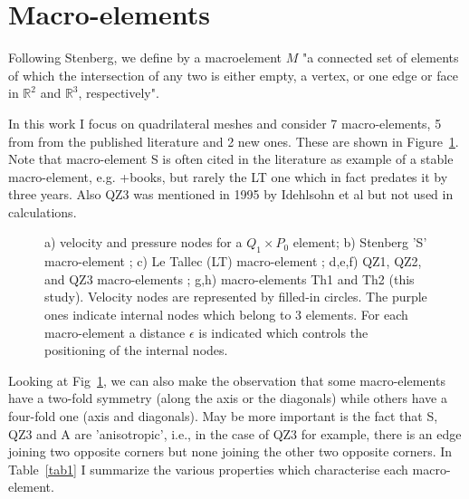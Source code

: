\documentclass[a4paper]{article}
\begin{document}





\section{Macro-elements}\label{sec3}

Following Stenberg\cite{sten90}, we define by a macroelement $M$ "a connected set of elements of which the 
intersection of any two is either empty, a vertex, or one edge or face in $\mathbb{R}^2$ 
and $\mathbb{R}^3$, respectively".

In this work I focus on quadrilateral meshes and consider 7 
macro-elements, 5 from from the published literature and 2 new ones. These are shown in Figure~\ref{fig:mes}.
Note that macro-element S is often cited in the literature as example of a stable macro-element, 
e.g. \cite{chba93}+books, but rarely the LT one which in fact predates it by three years. 
Also QZ3 was mentioned in 1995 by Idehlsohn et al \cite{idsn95} but not used in calculations. 

\begin{figure}[t]

\caption{
a) velocity and pressure nodes for a $Q_1\times P_0$ element;
b) Stenberg 'S' macro-element \cite{sten84}; 
c) Le Tallec (LT) macro-element \cite{leta81,leru86}; 
d,e,f) QZ1, QZ2, and QZ3 macro-elements \cite{qizh07}; 
g,h) macro-elements Th1 and Th2 (this study).
Velocity nodes are represented by filled-in circles. The purple ones indicate internal nodes which belong to 3 elements.
For each macro-element a distance $\epsilon$ is indicated which controls the positioning of the internal nodes.
\label{fig:mes}}
\end{figure}

Looking  at Fig~\ref{fig:mes}, we can also make the observation that some macro-elements 
have a two-fold symmetry (along the axis or the diagonals) while others have a four-fold one 
(axis and diagonals). May be more important is the fact that S, QZ3 and A are 'anisotropic', i.e., in 
the case of QZ3 for example, there is an edge joining two opposite corners but none joining the 
other two opposite corners.
In Table~\ref{tab1} I summarize the various properties which characterise each macro-element.
\end{document}
